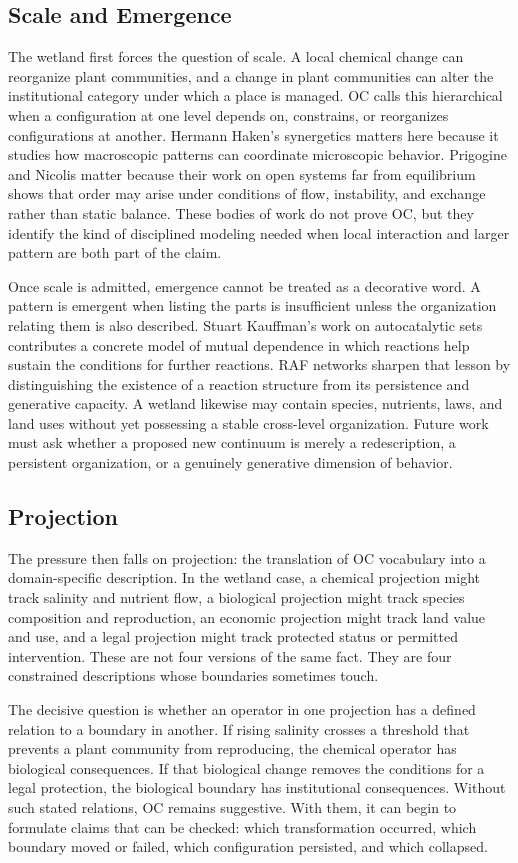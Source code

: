 \documentclass[11pt,a4paper,openany]{book}
\begin{document}
\subsection{Scale and Emergence}
The wetland first forces the question of scale. A local chemical change can reorganize plant communities, and a change in plant communities can alter the institutional category under which a place is managed. OC calls this hierarchical when a configuration at one level depends on, constrains, or reorganizes configurations at another. Hermann Haken's synergetics matters here because it studies how macroscopic patterns can coordinate microscopic behavior. Prigogine and Nicolis matter because their work on open systems far from equilibrium shows that order may arise under conditions of flow, instability, and exchange rather than static balance. These bodies of work do not prove OC, but they identify the kind of disciplined modeling needed when local interaction and larger pattern are both part of the claim. \cite{haken_synergetics,nicolis_prigogine_selforg}\par
Once scale is admitted, emergence cannot be treated as a decorative word. A pattern is emergent when listing the parts is insufficient unless the organization relating them is also described. Stuart Kauffman's work on autocatalytic sets contributes a concrete model of mutual dependence in which reactions help sustain the conditions for further reactions. RAF networks sharpen that lesson by distinguishing the existence of a reaction structure from its persistence and generative capacity. A wetland likewise may contain species, nutrients, laws, and land uses without yet possessing a stable cross-level organization. Future work must ask whether a proposed new continuum is merely a redescription, a persistent organization, or a genuinely generative dimension of behavior.\par
\subsection{Projection}
The pressure then falls on projection: the translation of OC vocabulary into a domain-specific description. In the wetland case, a chemical projection might track salinity and nutrient flow, a biological projection might track species composition and reproduction, an economic projection might track land value and use, and a legal projection might track protected status or permitted intervention. These are not four versions of the same fact. They are four constrained descriptions whose boundaries sometimes touch. \cite{haken_synergetics,nicolis_prigogine_selforg}\par
The decisive question is whether an operator in one projection has a defined relation to a boundary in another. If rising salinity crosses a threshold that prevents a plant community from reproducing, the chemical operator has biological consequences. If that biological change removes the conditions for a legal protection, the biological boundary has institutional consequences. Without such stated relations, OC remains suggestive. With them, it can begin to formulate claims that can be checked: which transformation occurred, which boundary moved or failed, which configuration persisted, and which collapsed.\par
\end{document}
